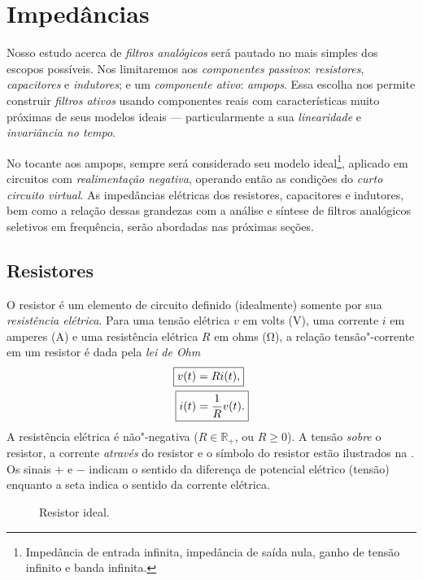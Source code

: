 \chapter{Impedâncias}

Nosso estudo acerca de \emph{filtros analógicos} será pautado no mais simples dos escopos possíveis. Nos limitaremos aos \emph{componentes passivos}: \emph{resistores}, \emph{capacitores} e \emph{indutores}; e um \emph{componente ativo}: \emph{\acp{ampop}}. Essa escolha nos permite construir \emph{filtros ativos} usando componentes reais com características muito próximas de seus modelos ideais --- particularmente a sua \emph{linearidade} e \emph{invariância no tempo}.

No tocante aos \acp{ampop}, sempre será considerado seu modelo ideal\footnote{Impedância de entrada infinita, impedância de saída nula, ganho de tensão infinito e banda infinita.}, aplicado em circuitos com \emph{realimentação negativa}, operando então as condições do \emph{curto circuito virtual}. As impedâncias elétricas dos resistores, capacitores e indutores, bem como a relação dessas grandezas com a análise e síntese de filtros analógicos seletivos em frequência, serão abordadas nas próximas seções.

\section{Resistores}
O resistor é um elemento de circuito definido (idealmente) somente por sua \emph{resistência elétrica}. Para uma tensão elétrica $v$ em volts (\unit{\volt}), uma corrente $i$ em amperes (\unit{\ampere}) e uma resistência elétrica $R$ em ohms (\unit{\ohm}), a relação tensão"-corrente em um resistor é dada pela \emph{lei de Ohm}
\begin{align}\label{eq:ohm}
	\Aboxed{v(t)&=Ri(t),}\\
	\Aboxed{i(t)&=\frac{1}{R}v(t).}
\end{align}
A resistência elétrica é não"-negativa ($R\in\mathbb{R}_+$, ou $R\geq0$). A tensão \emph{sobre} o resistor, a corrente \emph{através} do resistor e o símbolo do resistor estão ilustrados na . Os sinais $+$ e $-$ indicam o sentido da diferença de potencial elétrico (tensão) enquanto a seta  indica o sentido da corrente elétrica.

\begin{figure}
	\centering
	\caption{Resistor ideal.}
	\label{fig:resistor}
\end{figure}

